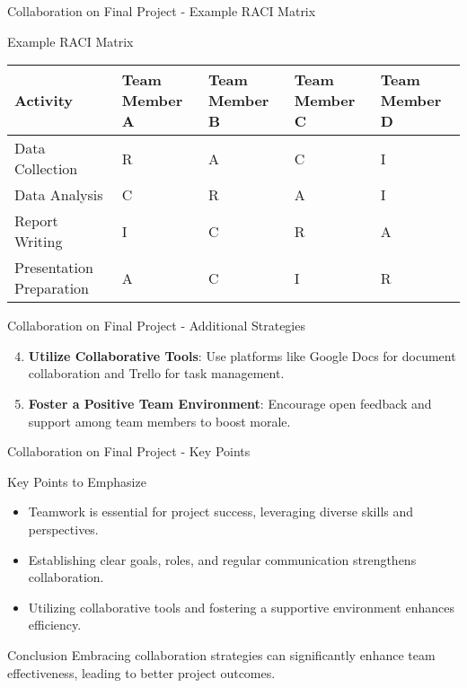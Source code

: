 \documentclass[aspectratio=169]{beamer}
\begin{document}
\begin{frame}[fragile]{Collaboration on Final Project - Example RACI Matrix}
    \begin{block}{Example RACI Matrix}
        \begin{tabular}{|l|l|l|l|l|}
            \hline
            Activity                     & Team Member A & Team Member B & Team Member C & Team Member D \\
            \hline
            Data Collection              & R             & A             & C             & I             \\
            \hline
            Data Analysis                & C             & R             & A             & I             \\
            \hline
            Report Writing               & I             & C             & R             & A             \\
            \hline
            Presentation Preparation      & A             & C             & I             & R             \\
            \hline
        \end{tabular}
    \end{block}
\end{frame}

\begin{frame}[fragile]{Collaboration on Final Project - Additional Strategies}
    \begin{enumerate}
        \setcounter{enumi}{3} %
        \item \textbf{Utilize Collaborative Tools}: Use platforms like Google Docs for document collaboration and Trello for task management.
        \item \textbf{Foster a Positive Team Environment}: Encourage open feedback and support among team members to boost morale.
    \end{enumerate}
\end{frame}

\begin{frame}[fragile]{Collaboration on Final Project - Key Points}
    \begin{block}{Key Points to Emphasize}
        \begin{itemize}
            \item Teamwork is essential for project success, leveraging diverse skills and perspectives.
            \item Establishing clear goals, roles, and regular communication strengthens collaboration.
            \item Utilizing collaborative tools and fostering a supportive environment enhances efficiency.
        \end{itemize}
    \end{block}
    \begin{block}{Conclusion}
        Embracing collaboration strategies can significantly enhance team effectiveness, leading to better project outcomes.
    \end{block}
\end{frame}
\end{document}
